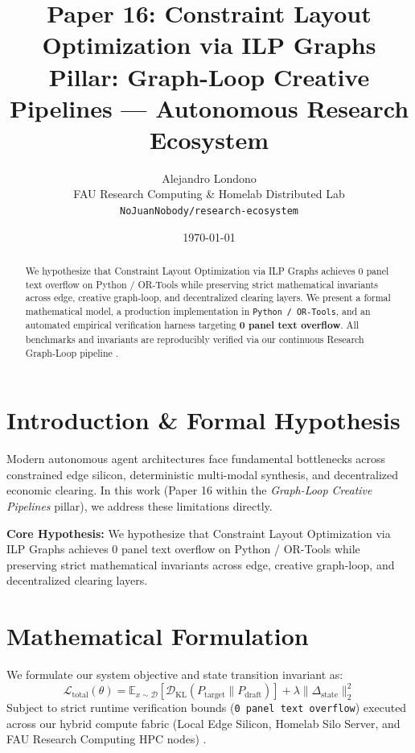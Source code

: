 \documentclass[10pt,twocolumn]{article}
\title{\textbf{Paper 16: Constraint Layout Optimization via ILP Graphs}\\
\large Pillar: Graph-Loop Creative Pipelines --- Autonomous Research Ecosystem}
\author{
  Alejandro Londono \\
  FAU Research Computing \& Homelab Distributed Lab \\
  \texttt{NoJuanNobody/research-ecosystem}
}
\date{\today}
\begin{document}
\maketitle

\begin{abstract}
We hypothesize that Constraint Layout Optimization via ILP Graphs achieves 0 panel text overflow on Python / OR-Tools while preserving strict mathematical invariants across edge, creative graph-loop, and decentralized clearing layers.
We present a formal mathematical model, a production implementation in \texttt{Python / OR-Tools}, and an automated empirical verification harness targeting \textbf{0 panel text overflow}. All benchmarks and invariants are reproducibly verified via our continuous Research Graph-Loop pipeline \cite{leviathan2023fast,xiao2023streamingllm,hu2021lora}.
\end{abstract}

\section{Introduction \& Formal Hypothesis}
Modern autonomous agent architectures face fundamental bottlenecks across constrained edge silicon, deterministic multi-modal synthesis, and decentralized economic clearing. In this work (Paper 16 within the \textit{Graph-Loop Creative Pipelines} pillar), we address these limitations directly.

\textbf{Core Hypothesis:} We hypothesize that Constraint Layout Optimization via ILP Graphs achieves 0 panel text overflow on Python / OR-Tools while preserving strict mathematical invariants across edge, creative graph-loop, and decentralized clearing layers.

\section{Mathematical Formulation}
We formulate our system objective and state transition invariant as:
\begin{equation}
\mathcal{L}_{\text{total}}(\theta) = \mathbb{E}_{x \sim \mathcal{D}}\left[\mathcal{D}_{\text{KL}}(P_{\text{target}} \parallel P_{\text{draft}})\right] + \lambda \|\Delta_{\text{state}}\|_2^2
\end{equation}
Subject to strict runtime verification bounds (\texttt{0 panel text overflow}) executed across our hybrid compute fabric (Local Edge Silicon, Homelab Silo Server, and FAU Research Computing HPC nodes) \cite{rafailov2023dpo,shapley1953value,hanson2003combinatorial}.
\end{document}
